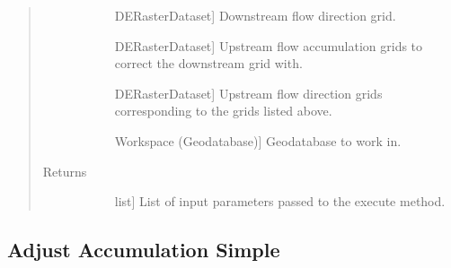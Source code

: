 \documentclass[letterpaper,10pt,english]{sphinxmanual}
\begin{document}
\begin{fulllineitems}
\begin{fulllineitems}
\begin{quote}
\begin{description}
\begin{description}
\item[{}] \leavevmode{[}DERasterDataset{]}
Downstream flow direction grid.

\item[{}] \leavevmode{[}DERasterDataset{]}
Upstream flow accumulation grids to correct the downstream grid with.

\item[{}] \leavevmode{[}DERasterDataset{]}
Upstream flow direction grids corresponding to the grids listed above.

\item[{}] \leavevmode{[}Workspace (Geodatabase){]}
Geodatabase to work in.

\end{description}

\item[{Returns}] \leavevmode\begin{description}
\item[{}] \leavevmode{[}list{]}
List of input parameters passed to the execute method.

\end{description}

\end{description}\end{quote}

\end{fulllineitems}


\end{fulllineitems}



\subsection{Adjust Accumulation Simple}
\label{\detokenize{StreamStats_DataPrep:adjust-accumulation-simple}}
\end{document}
